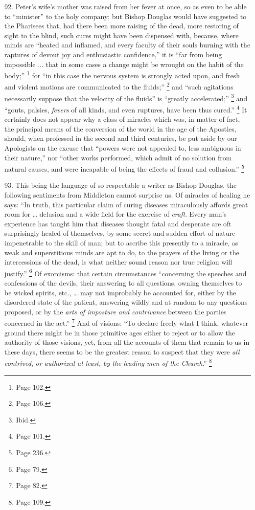 92.
Peter's wife's mother was raised from her fever at once, so as even to
be able to ``minister'' to the holy company; but Bishop Douglas would
have suggested to the Pharisees that, had there been more raising of
the dead, more restoring of sight to the blind, such cures might have
been dispensed with, because, where minds are ``heated and inflamed,
and every faculty of their souls burning with the raptures of devout
joy and enthusiastic confidence,'' it is ``far from being impossible ...
that in some cases a change might be wrought on the habit of the
body;'' \footnote{Page 102.} for ``in
this case the nervous system is strongly acted upon, and fresh and
violent motions are communicated to the fluids;'' \footnote{Page 106.} and ``such agitations necessarily suppose that the velocity of
the fluids'' is ``greatly accelerated;'' \footnote{Ibid.} and ``gouts, palsies, \emph{fevers} of all kinds, and even
ruptures, have been thus cured.'' \footnote{Page 101.} It certainly does not appear why a class of miracles which
was, in matter of fact, the principal means of the conversion of the
world in the age of the Apostles, should, when professed in the second
and third centuries, be put aside by our Apologists on the
excuse that ``powers were not appealed to, less ambiguous in their
nature,'' nor ``other works performed, which admit of no solution from
natural causes, and were incapable of being the effects of fraud and
collusion.'' \footnote{Page 236.}

93.
This being the language of so respectable a writer as Bishop Douglas,
the following sentiments from Middleton cannot surprise us. Of
miracles of healing he says: ``In truth, this particular claim of
curing diseases miraculously affords great room for … delusion and a
wide field for the exercise of \emph{craft}. Every man's experience
has taught him that diseases thought fatal and desperate are oft
surprisingly healed of themselves, by some secret and sudden effort of
nature impenetrable to the skill of man; but to ascribe this presently
to a miracle, as weak and superstitious minds are apt to do, to the
prayers of the living or the intercessions of the dead, is what
neither sound reason nor true religion will justify.'' \footnote{Page 79.} Of exorcisms: that certain circumstances ``concerning the
speeches and confessions of the devils, their answering to all
questions, owning themselves to be wicked spirits, etc., … may not
improbably be accounted for, either by the disordered state of the
patient, answering wildly and at random to any questions proposed, or
by the \emph{arts of imposture and contrivance} between the parties
concerned in the act.'' \footnote{Page 82.} And of visions: ``To declare freely what I think, whatever
ground there might be in those primitive ages either to reject or to
allow the authority of those visions, yet, from all the accounts of
them that remain to us in these days, there seems to be the greatest
reason to suspect that they were \emph{all contrived}, \emph{or
authorized at least, by the leading men of the Church}.'' \footnote{Page 109.}


